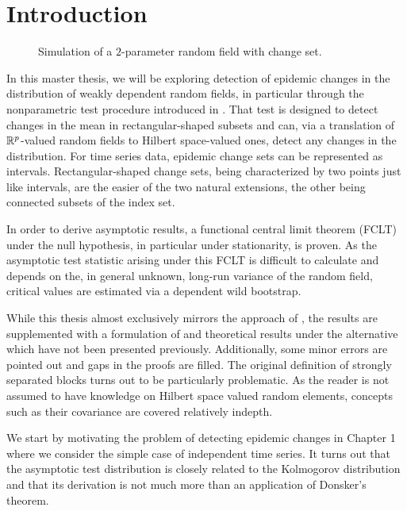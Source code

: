 \chapter{Introduction}

\begin{figure}
    \centering
    \def\svgwidth{0.5\columnwidth} 
    
    \caption{Simulation of a $2$-parameter random field with change set.}
\end{figure}

In this master thesis, we will be exploring detection of epidemic changes in the distribution of weakly dependent random fields, in particular through the nonparametric test procedure introduced in \cite{[0]BUCCHIA2017344}. That test is designed to detect changes in the mean in rectangular-shaped subsets and can, via a translation of $\mathbb{R}^p$-valued random fields to Hilbert space-valued ones, detect any changes in the distribution. 
For time series data, epidemic change sets can be represented as intervals. Rectangular-shaped change sets, being characterized by two points just like intervals, are the easier of the two natural extensions, the other being connected subsets of the index set.

In order to derive asymptotic results, a functional central limit theorem (FCLT) under the null hypothesis, in particular under stationarity, is proven. As the asymptotic test statistic arising under this FCLT is difficult to calculate and depends on the, in general unknown, long-run variance of the random field, critical values are estimated via a dependent wild bootstrap.

While this thesis almost exclusively mirrors the approach of \cite{[0]BUCCHIA2017344}, the results are supplemented with a formulation of and theoretical results under the alternative which have not been presented previously. Additionally, some minor errors are pointed out and gaps in the proofs are filled. The original definition of strongly separated blocks turns out to be particularly problematic.
As the reader is not assumed to have knowledge on Hilbert space valued random elements, concepts such as their covariance are covered relatively indepth.

We start by motivating the problem of detecting epidemic changes in Chapter 1 where we consider the simple case of independent time series. It turns out that the asymptotic test distribution is closely related to the Kolmogorov distribution and that its derivation is not much more than an application of Donsker's theorem.


